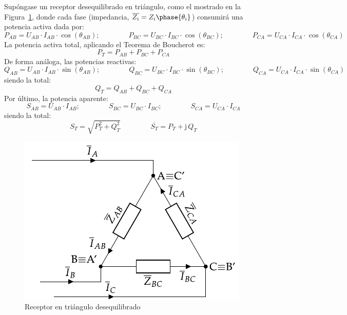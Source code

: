 \documentclass[11pt]{book} %
\numberwithin{dummy}{section}
\theoremstyle{ocrenumbox}
\theoremstyle{blacknumex}
\theoremstyle{blacknumbox}
\theoremstyle{ocrenum}
\begin{document}
	Supóngase un receptor desequilibrado en triángulo, como el mostrado en la Figura~\ref{fig.trianguloDesequilibrado_receptor_potencia}, donde cada fase (impedancia, $\overline{Z_i}=Z_i\phase{\theta_i}$) consumirá una potencia activa dada por: 
	\begin{equation*}
	    P_{AB}=U_{AB}\cdot I_{AB} \cdot \cos(\theta_{AB});\qquad \qquad
	    P_{BC}=U_{BC}\cdot I_{BC} \cdot \cos(\theta_{BC});\qquad \qquad
	    P_{CA}=U_{CA}\cdot I_{CA} \cdot \cos(\theta_{CA})
	\end{equation*}
	La potencia activa total, aplicando el Teorema de Boucherot es:
	\begin{equation}
	    \boxed{P_T=P_{AB}+P_{BC}+P_{CA}}
	\end{equation}
	De forma análoga, las potencias reactivas:
	\begin{equation*}
	    Q_{AB}=U_{AB}\cdot I_{AB} \cdot \sin(\theta_{AB});\qquad \qquad
	    Q_{BC}=U_{BC}\cdot I_{BC} \cdot \sin(\theta_{BC});\qquad \qquad
	    Q_{CA}=U_{CA}\cdot I_{CA} \cdot \sin(\theta_{CA})
	\end{equation*}
	siendo la total: 
	\begin{equation}
	    \boxed{Q_T=Q_{AB}+Q_{BC}+Q_{CA}}
	\end{equation}
	Por último, la potencia aparente: 
	\begin{equation*}
	    S_{AB}=U_{AB}\cdot I_{AB};\qquad \qquad
	    S_{BC}=U_{BC}\cdot I_{BC};\qquad \qquad
	    S_{CA}=U_{CA}\cdot I_{CA}
	\end{equation*}
	siendo la total: 
	\begin{equation}
	    \boxed{S_T=\sqrt{P_T^2+Q_T^2}}\,\qquad\qquad \boxed{\overline{S_T}=P_T+\mathrm{j}\,Q_T}
	\end{equation}
	
	\begin{figure}
	    \centering
	    \includegraphics{../figs/trianguloDesequilibrado_receptor.pdf}
	    \caption{Receptor en triángulo desequilibrado}
	    \label{fig.trianguloDesequilibrado_receptor_potencia}
	\end{figure}
	
\end{document}
